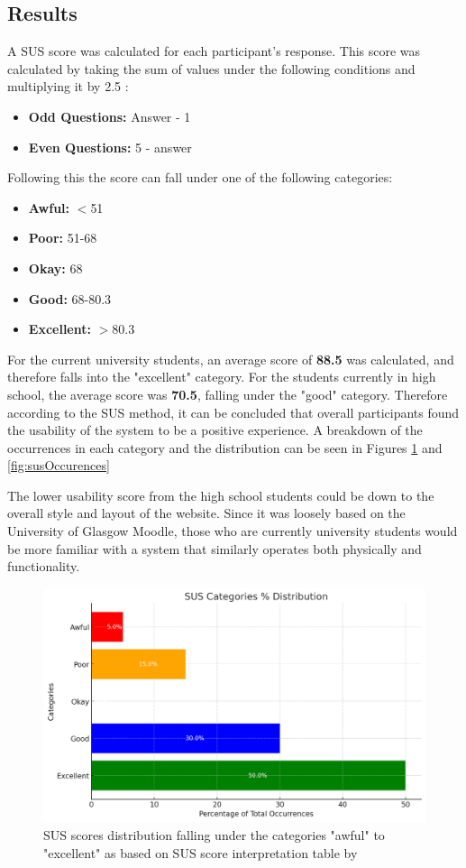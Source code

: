 \documentclass{l4proj}
\begin{document}
\subsection{Results}
A SUS score was calculated for each participant's response. This score was calculated by taking the sum of values under the following conditions and multiplying it by 2.5 \citep{T_2021}:
\begin{itemize}
    \item \textbf{Odd Questions:} Answer - 1
    \item \textbf{Even Questions:} 5 - answer
\end{itemize}
Following this the score can fall under one of the following categories:
\begin{itemize}
    \item \textbf{Awful:} $<$51
    \item \textbf{Poor:} 51-68
    \item \textbf{Okay:} 68
    \item \textbf{Good:} 68-80.3
    \item \textbf{Excellent:} $>$80.3
\end{itemize}
For the current university students,  an average score of \textbf{88.5} was calculated,  and therefore falls into the "excellent" category. For the students currently in high school,  the average score was \textbf{70.5},  falling under the "good" category. Therefore according to the SUS method,  it can be concluded that overall participants found the usability of the system to be a positive experience. A breakdown of the occurrences in each category and the distribution can be seen in Figures \ref{fig:susDistribution} and \ref{fig:susOccurences}

The lower usability score from the high school students could be down to the overall style and layout of the website. Since it was loosely based on the University of Glasgow Moodle,  those who are currently university students would be more familiar with a system that similarly operates both physically and functionality.

\begin{figure}[ht]
    \centering
    \includegraphics[width=0.7\linewidth]{images/susDistribution.pdf}    

    \caption{SUS scores distribution falling under the categories "awful" to "excellent" as based on SUS score interpretation table by \cite{T_2021}
    }

    \label{fig:susDistribution} 
\end{figure}
\end{document}

